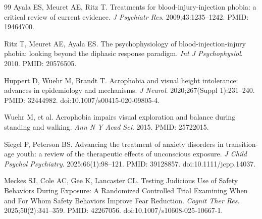 \documentclass[11pt]{article}
\begin{document}
\begin{thebibliography}{99}
Ayala ES, Meuret AE, Ritz T. Treatments for blood-injury-injection phobia: a critical review of current evidence. \emph{J Psychiatr Res}. 2009;43:1235--1242. PMID: 19464700.

Ritz T, Meuret AE, Ayala ES. The psychophysiology of blood-injection-injury phobia: looking beyond the diphasic response paradigm. \emph{Int J Psychophysiol}. 2010. PMID: 20576505.

Huppert D, Wuehr M, Brandt T. Acrophobia and visual height intolerance: advances in epidemiology and mechanisms. \emph{J Neurol}. 2020;267(Suppl 1):231--240. PMID: 32444982. doi:10.1007/s00415-020-09805-4.

Wuehr M, et al. Acrophobia impairs visual exploration and balance during standing and walking. \emph{Ann N Y Acad Sci}. 2015. PMID: 25722015.

Siegel P, Peterson BS. Advancing the treatment of anxiety disorders in transition-age youth: a review of the therapeutic effects of unconscious exposure. \emph{J Child Psychol Psychiatry}. 2025;66(1):98--121. PMID: 39128857. doi:10.1111/jcpp.14037.

Meckes SJ, Cole AC, Gee K, Lancaster CL. Testing Judicious Use of Safety Behaviors During Exposure: A Randomized Controlled Trial Examining When and For Whom Safety Behaviors Improve Fear Reduction. \emph{Cognit Ther Res}. 2025;50(2):341--359. PMID: 42267056. doi:10.1007/s10608-025-10667-1.

\end{thebibliography}
\end{document}
